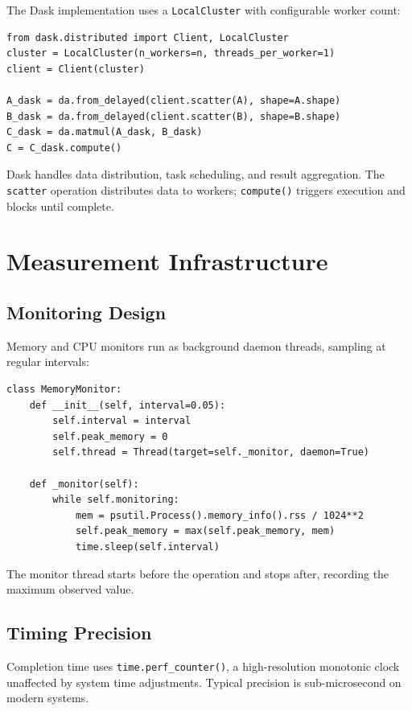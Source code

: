 The Dask implementation uses a \texttt{LocalCluster} with configurable worker count:

\begin{verbatim}
from dask.distributed import Client, LocalCluster
cluster = LocalCluster(n_workers=n, threads_per_worker=1)
client = Client(cluster)

A_dask = da.from_delayed(client.scatter(A), shape=A.shape)
B_dask = da.from_delayed(client.scatter(B), shape=B.shape)
C_dask = da.matmul(A_dask, B_dask)
C = C_dask.compute()
\end{verbatim}

Dask handles data distribution, task scheduling, and result aggregation. The \texttt{scatter} operation distributes data to workers; \texttt{compute()} triggers execution and blocks until complete.

\section{Measurement Infrastructure}

\subsection{Monitoring Design}

Memory and CPU monitors run as background daemon threads, sampling at regular intervals:

\begin{verbatim}
class MemoryMonitor:
    def __init__(self, interval=0.05):
        self.interval = interval
        self.peak_memory = 0
        self.thread = Thread(target=self._monitor, daemon=True)
    
    def _monitor(self):
        while self.monitoring:
            mem = psutil.Process().memory_info().rss / 1024**2
            self.peak_memory = max(self.peak_memory, mem)
            time.sleep(self.interval)
\end{verbatim}

The monitor thread starts before the operation and stops after, recording the maximum observed value.

\subsection{Timing Precision}

Completion time uses \texttt{time.perf\_counter()}, a high-resolution monotonic clock unaffected by system time adjustments. Typical precision is sub-microsecond on modern systems.

